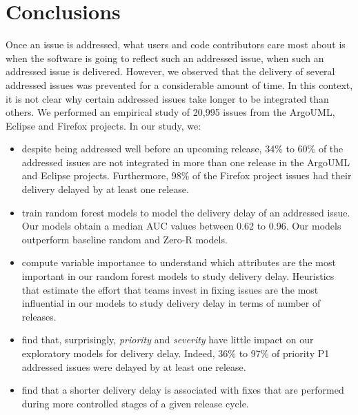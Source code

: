 \section{Conclusions}\label{ch4:conclusion} Once an issue is
addressed, what users and code contributors care most about is when the software
is going to reflect such an addressed issue, \ie when such an addressed issue is
delivered. However, we observed that the delivery of several addressed issues
was prevented for a considerable amount of time. In this context, it is not clear why certain
addressed issues take longer to be integrated than others. We performed
an empirical study of 20,995 issues from the ArgoUML, Eclipse and Firefox
projects. In our study, we:
\\
	\begin{itemize}
		\item despite being addressed well before an upcoming release, 34\% to
			60\% of the addressed issues are not integrated in more than one
			release in the ArgoUML and Eclipse projects. Furthermore, 98\%
			of the Firefox project issues had their delivery delayed by
			at least one release. \\

		\item train random forest models to model the delivery
			delay of an addressed issue. Our models obtain a
			median AUC values between 0.62 to 0.96. Our models
			outperform baseline random and Zero-R models. \\

		\item compute variable importance 
			to understand which attributes are the most important in
			our random forest models to study delivery delay.
			Heuristics that estimate the effort that teams invest in
			fixing issues are the most influential in
			our models to study delivery delay in terms of number of
			releases. \\
			
		\item find that, surprisingly, \textit{priority} and
			\textit{severity} have little impact on our exploratory
			models for delivery delay.
			Indeed, 36\% to 97\% of priority P1 addressed issues
			were delayed by at least one release. \\ 

		\item find that a shorter delivery delay is associated with
			fixes that are performed during more controlled stages
			of a given release cycle.\\


\end{itemize}

